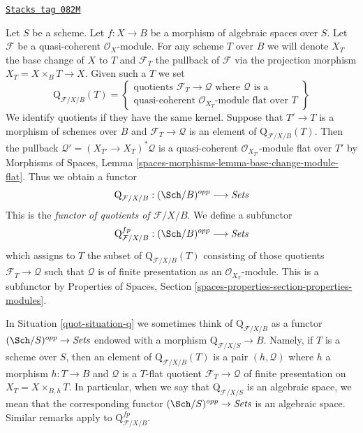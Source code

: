 \begin{definition}[Situation: Q]
\label{quot-situation-q}
\href{https://stacks.math.columbia.edu/tag/082M}{\texttt{Stacks tag 082M}}

Let $S$ be a scheme. Let $f : X \to B$ be a morphism of algebraic spaces
over $S$. Let $\mathcal{F}$ be a quasi-coherent $\mathcal{O}_X$-module.
For any scheme $T$ over $B$ we will denote $X_T$ the base change of
$X$ to $T$ and $\mathcal{F}_T$ the pullback
of $\mathcal{F}$ via the projection morphism $X_T = X \times_B T \to X$.
Given such a $T$ we set
$$
\text{Q}_{\mathcal{F}/X/B}(T) =
\left\{
\begin{matrix}
\text{quotients }\mathcal{F}_T \to \mathcal{Q}\text{ where }
\mathcal{Q}\text{ is a}\\
\text{quasi-coherent }
\mathcal{O}_{X_T}\text{-module flat over }T
\end{matrix}
\right\}
$$
We identify quotients if they have the same kernel. Suppose
that $T' \to T$ is a morphism of schemes over $B$ and
$\mathcal{F}_T \to \mathcal{Q}$ is an element of
$\text{Q}_{\mathcal{F}/X/B}(T)$. Then the pullback
$\mathcal{Q}' = (X_{T'} \to X_T)^*\mathcal{Q}$ is a quasi-coherent
$\mathcal{O}_{X_{T'}}$-module flat over $T'$ by
Morphisms of Spaces, Lemma
\ref{spaces-morphisms-lemma-base-change-module-flat}.
Thus we obtain a functor
\begin{equation}
\label{equation-q}
\text{Q}_{\mathcal{F}/X/B} : (\Sch/B)^{opp} \longrightarrow \textit{Sets}
\end{equation}
This is the {\it functor of quotients of $\mathcal{F}/X/B$}.
We define a subfunctor
\begin{equation}
\label{equation-q-fp}
\text{Q}^{fp}_{\mathcal{F}/X/B} : (\Sch/B)^{opp} \longrightarrow \textit{Sets}
\end{equation}
which assigns to $T$ the subset of $\text{Q}_{\mathcal{F}/X/B}(T)$
consisting of those quotients $\mathcal{F}_T \to \mathcal{Q}$
such that $\mathcal{Q}$ is of finite presentation as an
$\mathcal{O}_{X_T}$-module. This is a subfunctor by
Properties of Spaces, Section
\ref{spaces-properties-section-properties-modules}.
\end{definition}

In Situation \ref{quot-situation-q} we sometimes think of
$\text{Q}_{\mathcal{F}/X/B}$ as a functor
$(\Sch/S)^{opp} \to \textit{Sets}$ endowed
with a morphism $\text{Q}_{\mathcal{F}/X/S} \to B$.
Namely, if $T$ is a scheme over $S$, then an element
of $\text{Q}_{\mathcal{F}/X/B}(T)$ is a pair $(h, \mathcal{Q})$
where $h$ a morphism $h : T \to B$
and $\mathcal{Q}$ is a $T$-flat quotient $\mathcal{F}_T \to \mathcal{Q}$
of finite presentation on $X_T = X \times_{B, h} T$. In particular, when we say
that $\text{Q}_{\mathcal{F}/X/S}$ is an algebraic space, we mean that the
corresponding functor $(\Sch/S)^{opp} \to \textit{Sets}$ is an algebraic space.
Similar remarks apply to $\text{Q}^{fp}_{\mathcal{F}/X/B}$.

